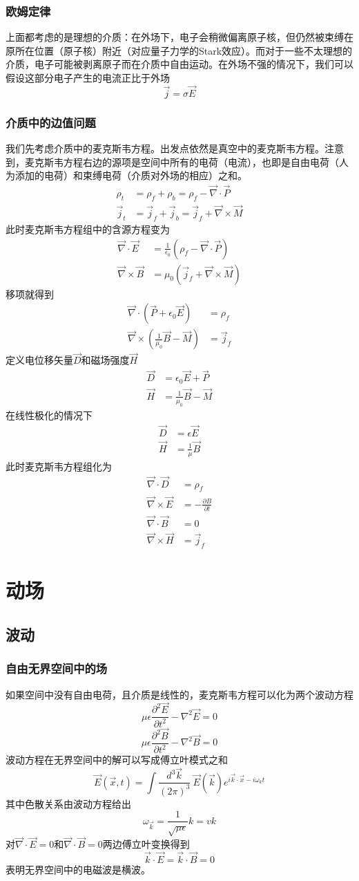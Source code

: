 \documentclass[a4paper,11pt]{ctexbook}
\newcommand{\beq}{\begin{equation}}
\newcommand{\eeq}{\end{equation}}
\newcommand{\bea}{\begin{equation}\begin{aligned}}
\newcommand{\eea}{\end{aligned}\end{equation}}
\newcommand{\del}{\vec{\nabla}}
\newcommand{\epv}{\epsilon_0}
\begin{document}
 \subsection{欧姆定律}
 上面都考虑的是理想的介质：在外场下，电子会稍微偏离原子核，但仍然被束缚在原所在位置（原子核）附近（对应量子力学的Stark效应）。而对于一些不太理想的介质，电子可能被剥离原子而在介质中自由运动。在外场不强的情况下，我们可以假设这部分电子产生的电流正比于外场
 \beq
 \vec j = \sigma \vec E
 \eeq
 \subsection{介质中的边值问题}
 我们先考虑介质中的麦克斯韦方程。出发点依然是真空中的麦克斯韦方程。注意到，麦克斯韦方程右边的源项是空间中所有的电荷（电流），也即是自由电荷（人为添加的电荷）和束缚电荷（介质对外场的相应）之和。
 \bea
 \rho_t &= \rho_f + \rho_b  = \rho_f - \del \cdot \vec P\\
\vec{j}_t &= \vec{j}_f + \vec{j}_b = \vec{j}_f + \del \times \vec{M}
\eea
此时麦克斯韦方程组中的含源方程变为
\bea
\del \cdot \vec E &= \frac{1}{\epv}(\rho_f - \del \cdot \vec P) \\
\del \times \vec B &= \mu_0 ( \vec{j}_f + \del \times \vec{M})
\eea
移项就得到
\bea
\del \cdot \left(\vec P  + \epv \vec E \right) &= \rho_f \\
\del \times \left( \frac{1}{\mu_0} \vec B- \vec M\right) &= \vec{j}_f
\eea
定义电位移矢量$\vec D$和磁场强度$\vec H$
\bea
\vec D &= \epv \vec E + \vec P \\
\vec H &= \frac{1}{\mu_0} \vec B - \vec M
\eea
在线性极化的情况下
\bea
\vec D &= \epsilon \vec E\\
\vec H &= \frac{1}{\mu} \vec B
\eea
此时麦克斯韦方程组化为
\bea
\del \cdot \vec D &= \rho_f \\
\del \times \vec E &= - \frac{\partial B}{\partial t} \\
\del \cdot \vec B &= 0 \\
\del \times \vec H &= \vec{j}_f
\eea



\chapter{动场}
\section{波动}
\subsection{自由无界空间中的场}
如果空间中没有自由电荷，且介质是线性的，麦克斯韦方程可以化为两个波动方程
\beq
\mu \epsilon \frac{\partial^2 \vec E }{\partial t^2} - \nabla^2 \vec E = 0
\eeq
\beq
\mu \epsilon \frac{\partial^2 \vec B }{\partial t^2} - \nabla^2 \vec B = 0
\eeq
波动方程在无界空间中的解可以写成傅立叶模式之和
\beq
\vec E (\vec x,t) = \int \frac{d^3 \vec k}{(2\pi)^3} \ \vec E(\vec k) e^{i\vec k \cdot \vec x - i \omega_k t}
\eeq
其中色散关系由波动方程给出
\beq
\omega_{\vec k} = \frac{1}{\sqrt{\mu \epsilon}} k = vk
\eeq
对$\del \cdot \vec E = 0$和$\del \cdot \vec B =0$两边傅立叶变换得到
\beq
\vec k \cdot \vec E = \vec k \cdot \vec B =0
\eeq
表明无界空间中的电磁波是横波。
\end{document}

